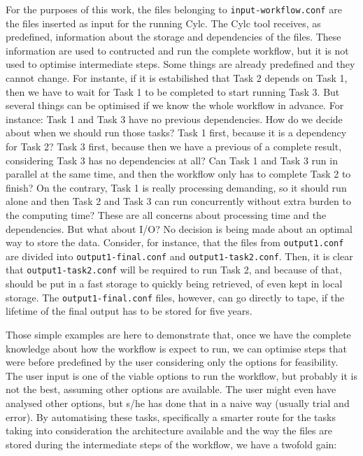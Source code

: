 \documentclass[a4paper, twocolumn]{article}
\begin{document}
For the purposes of this work, the files belonging to \texttt{input-workflow.conf} are the files inserted as input for the running Cylc. The Cylc tool receives, as predefined, information about the storage and dependencies of the files. These information are used to contructed and run the complete workflow, but it is not used to optimise intermediate steps. Some things are already predefined and they cannot change. For instante, if it is estabilished that Task 2 depends on Task 1, then we have to wait for Task 1 to be completed to start running Task 3. But several things can be optimised if we know the whole workflow in advance. For instance: Task 1 and Task 3 have no previous dependencies. How do we decide about when we should run those tasks? Task 1 first, because it is a dependency for Task 2? Task 3 first, because then we have a previous of a complete result, considering Task 3 has no dependencies at all? Can Task 1 and Task 3 run in parallel at the same time, and then the workflow only has to complete Task 2 to finish? On the contrary, Task 1 is really processing demanding, so it should run alone and then Task 2 and Task 3 can run concurrently without extra burden to the computing time? These are all concerns about processing time and the dependencies. But what about I/O? No decision is being made about an optimal way to store the data. Consider, for instance, that the files from \texttt{output1.conf} are divided into \texttt{output1-final.conf} and \texttt{output1-task2.conf}. Then, it is clear that \texttt{output1-task2.conf} will be required to run Task 2, and because of that, should be put in a fast storage to quickly being retrieved, of even kept in local storage. The \texttt{output1-final.conf} files, however, can go directly to tape, if the lifetime of the final output has to be stored for five years.

Those simple examples are here to demonstrate that, once we have the complete knowledge about how the workflow is expect to run, we can optimise steps that were before predefined by the user considering only the options for feasibility. The user input is one of the viable options to run the workflow, but probably it is not the best, assuming other options are available. The user might even have analysed other options, but s/he has done that in a naive way (usually trial and error). By automatising these tasks, specifically a smarter route for the tasks taking into consideration the architecture available and the way the files are stored during the intermediate steps of the workflow, we have a twofold gain:
\end{document}
